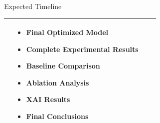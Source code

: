 \documentclass[aspectratio=169,11pt]{beamer}
\begin{document}
\begin{frame}{Expected Timeline}
\begin{tabular}{p{}p{}p{}p{}}
&

\begin{itemize}
    \item Final Optimized Model
    \item Complete Experimental Results
    \item Baseline Comparison
    \item Ablation Analysis
    \item XAI Results
    \item Final Conclusions
  
\end{itemize}

\\

\bottomrule
\end{tabular}

\end{frame}
\end{document}
